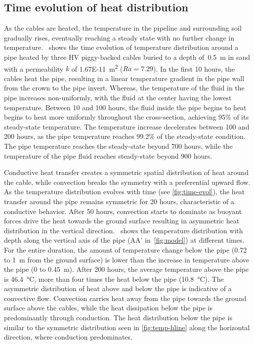 \documentclass[Journal,letterpaper,InsideFigs]{ascelike-new}
\begin{document}
\subsection*{Time evolution of heat distribution}
As the cables are heated, the temperature in the pipeline and surrounding soil gradually rises, eventually reaching a steady state with no further change in temperature.~ shows the time evolution of temperature distribution around a pipe heated by three HV piggy-backed cables buried to a depth of~\SI{0.5}{\meter} in sand with a permeability $k$ of \SI{1.67E-11}{\meter\squared} ($Ra = 7.29$). In the first 10 hours, the cables heat the pipe, resulting in a linear temperature gradient in the pipe wall from the crown to the pipe invert. Whereas, the temperature of the fluid in the pipe increases non-uniformly, with the fluid at the center having the lowest temperature. Between 10 and 100 hours, the fluid inside the pipe begins to heat begins to heat more uniformly throughout the cross-section, achieving 95\% of its steady-state temperature. The temperature increase decelerates between 100 and 200 hours, as the pipe temperature reaches 99.2\% of the steady-state condition. The pipe temperature reaches the steady-state beyond 700 hours, while the temperature of the pipe fluid reaches steady-state beyond 900 hours. 

Conductive heat transfer creates a symmetric spatial distribution of heat around the cable, while convection breaks the symmetry with a preferential upward flow. As the temperature distribution evolves with time (see \cref{fig:time-evol}), the heat transfer around the pipe remains symmetric for 20 hours, characteristic of a conductive behavior. After 50 hours, convection starts to dominate as buoyant forces drive the heat towards the ground surface resulting in asymmetric heat distribution in the vertical direction.~ shows the temperature distribution with depth along the vertical axis of the pipe (AA’ in~\cref{fig:model}) at different times. For the entire duration, the amount of temperature change below the pipe (0.72 to \SI{1}{\meter} from the ground surface) is lower than the increase in temperature above the pipe (0 to \SI{0.45}{\meter}). After 200 hours, the average temperature above the pipe is \SI{46.4}{\celsius}, more than four times the heat below the pipe (\SI{10.8}{\celsius}). The asymmetric distribution of heat above and below the pipe is indicative of a convective flow. Convection carries heat away from the pipe towards the ground surface above the cables, while the heat dissipation below the pipe is predominantly through conduction. The heat distribution below the pipe is similar to the symmetric distribution seen in \cref{fig:temp-hline} along the horizontal direction, where conduction predominates. 
\end{document}
